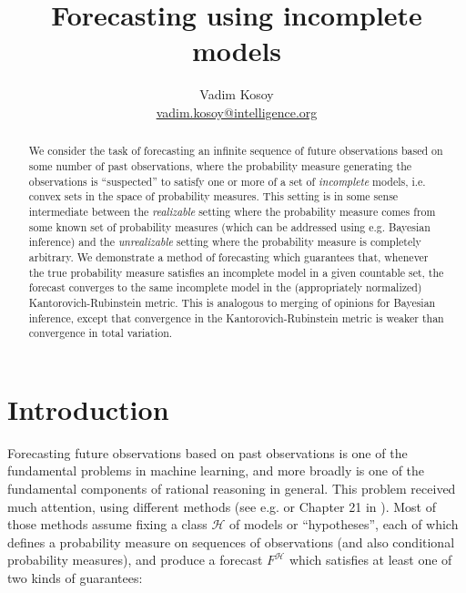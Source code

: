 \documentclass[11pt]{article}
\theoremstyle{definition}
\theoremstyle{plain}
\newcommand{\MC}{\mathcal{H}}
\begin{document}
\title{Forecasting using incomplete models}
\author{Vadim Kosoy \\ \href{mailto:vadim.kosoy@intelligence.org}{vadim.kosoy@intelligence.org}}
\date{}%
\maketitle

\begin{abstract}
We consider the task of forecasting an infinite sequence of future observations based on some number of past observations, where the probability measure generating the observations is \enquote{suspected} to satisfy one or more of a set of \emph{incomplete} models, i.e. convex sets in the space of probability measures. This setting is in some sense intermediate between the \emph{realizable} setting where the probability measure comes from some known set of probability measures (which can be addressed using e.g. Bayesian inference) and the \emph{unrealizable} setting where the probability measure is completely arbitrary. We demonstrate a method of forecasting which guarantees that, whenever the true probability measure satisfies an incomplete model in a given countable set, the forecast converges to the same incomplete model in the (appropriately normalized) Kantorovich-Rubinstein metric. This is analogous to merging of opinions for Bayesian inference, except that convergence in the Kantorovich-Rubinstein metric is weaker than convergence in total variation.
\end{abstract}


\section{Introduction}

Forecasting future observations based on past observations is one of the fundamental problems in machine learning, and more broadly is one of the fundamental components of rational reasoning in general. This problem received much attention, using different methods (see e.g. \cite{Cesa-Bianchi_2006} or Chapter 21 in \cite{Shalev-Shwartz_2014}). Most of those methods assume fixing a class $\MC$ of models or \enquote{hypotheses}, each of which defines a probability measure on sequences of observations (and also conditional probability measures), and produce a forecast $F^\MC$ which satisfies at least one of two kinds of guarantees:
\end{document}
